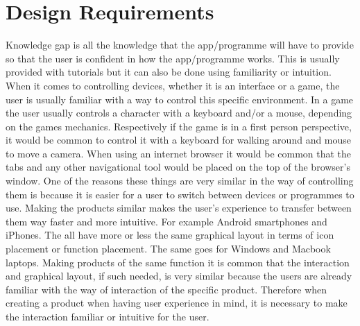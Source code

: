 \section{Design Requirements}
Knowledge gap is all the knowledge that the app/programme will have to provide so that the user is confident in how the app/programme works. This is usually provided with tutorials but it can also be done using familiarity or intuition. When it comes to controlling devices, whether it is an interface or a game, the user is usually familiar with a way to control this specific environment. In a game the user usually controls a character with a keyboard and/or a mouse, depending on the games mechanics.  Respectively if the game is in a first person perspective, it would be common to control it with a keyboard for walking around and mouse to move a camera.  When using an internet browser it would be common that the tabs and any other navigational tool would be placed on the top of the browser’s window. One of the reasons these things are very similar in the way of controlling them is because it is easier for a user to switch between devices or programmes to use. Making the products similar makes the user’s experience to transfer between them way faster and more intuitive. For example Android smartphones and iPhones. The all have more or less the same graphical layout in terms of icon placement or function placement. The same goes for Windows and Macbook laptops. 
Making products of the same function it is common that the interaction and graphical layout, if such needed, is very similar because the users are already familiar with the way of interaction of the specific product. 
Therefore when creating a product when having user experience in mind, it is necessary to make the interaction familiar or intuitive for the user. 


